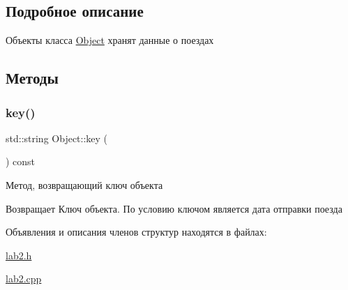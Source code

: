 \subsection{Подробное описание}
Объекты класса \mbox{\hyperlink{structObject}{Object}} хранят данные о поездах 

\subsection{Методы}
\mbox{\label{structObject_a6c61558f8856dd361295073e79c4b73c}} 
\subsubsection{\texorpdfstring{key()}{key()}}
{\footnotesize\ttfamily std\+::string Object\+::key (\begin{DoxyParamCaption}{ }\end{DoxyParamCaption}) const}



Метод, возвращающий ключ объекта 

\begin{DoxyReturn}{Возвращает}
Ключ объекта. По условию ключом является дата отправки поезда 
\end{DoxyReturn}


Объявления и описания членов структур находятся в файлах\+:\begin{DoxyCompactItemize}
\item 
\mbox{\hyperlink{lab2_8h}{lab2.\+h}}\item 
\mbox{\hyperlink{lab2_8cpp}{lab2.\+cpp}}\end{DoxyCompactItemize}
